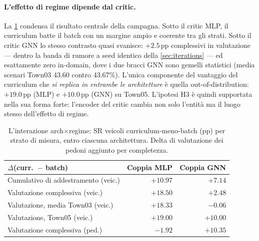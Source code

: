 \paragraph{L'effetto di regime dipende dal critic.}
La \cref{tab:interaction} condensa il risultato centrale della
campagna. Sotto il critic MLP, il curriculum batte il batch con un
margine ampio e coerente tra gli strati. Sotto il critic GNN lo stesso
contrasto quasi svanisce: $+2.5$\,pp complessivi in valutazione ---
dentro la banda di rumore a seed identico della \cref{sec:iterations}
--- ed esattamente zero in-domain, dove i due bracci GNN sono gemelli
statistici (media scenari Town03 43.60 contro 43.67\%). L'unica
componente del vantaggio del curriculum che \emph{si replica in
entrambe le architetture} è quella out-of-distribution: $+19.0$\,pp
(MLP) e $+10.0$\,pp (GNN) su Town05. L'ipotesi H3 è quindi supportata
nella sua forma forte: l'encoder del critic cambia non solo l'entità ma
il luogo stesso dell'effetto di regime.

\begin{table}[t]
  \centering\small
  \caption{L'interazione arch$\times$regime: SR veicoli
  curriculum-meno-batch (pp) per strato di misura, entro ciascuna
  architettura. Delta di valutazione dei pedoni aggiunto per
  completezza.}
  \label{tab:interaction}
  \begin{tabular}{@{}lrr@{}}
    \toprule
    $\Delta$(curr.\ $-$ batch) & Coppia MLP & Coppia GNN \\
    \midrule
    Cumulativo di addestramento (veic.) & $+10.97$ & $+7.14$ \\
    Valutazione complessiva (veic.) & $+18.50$ & $+2.48$ \\
    Valutazione, media Town03 (veic.) & $+18.33$ & $-0.06$ \\
    Valutazione, Town05 (veic.) & $+19.00$ & $+10.00$ \\
    Valutazione complessiva (ped.) & $-1.92$ & $+10.35$ \\
    \bottomrule
  \end{tabular}
\end{table}

